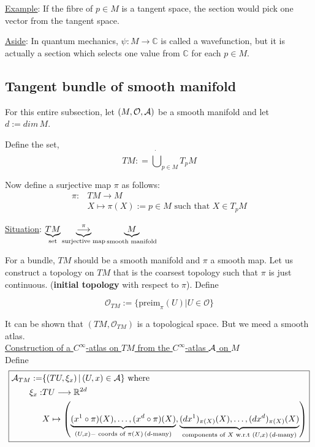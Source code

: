\underline{Example}: If the fibre of $p \in M$ is a tangent space, the section would pick one vector from the tangent space.

\underline{Aside}: In quantum mechanics, $\psi : M \to \mathbb{C}$ is called a wavefunction, but it is actually a section which selects one value from $\mathbb{C}$ for each $p \in M$.


\subsection{Tangent bundle of smooth manifold}
For this entire subsection, let $(M, \mathcal{O}, \mathcal{A})$ be a smooth manifold and let $d := dim \, M$. 

Define the set, 
\begin{equation}
\boxed{TM : = \dot{\bigcup}_{p \in M} T_pM}
\end{equation}

Now define a surjective map $\pi$ as follows:
\begin{equation}
\boxed{\begin{split}
  \pi : & TM \to M \\
  & X \mapsto \pi(X) := p \in M \text{ such that } X \in T_pM
\end{split}}
\end{equation}

\underline{Situation}:  $\underbrace{TM}_{\text{set}} \underbrace{ \stackrel{\pi}{\longrightarrow}}_{\text{surjective map}} \underbrace{M}_{\text{smooth manifold}}$

For a bundle, $TM$ should be a smooth manifold and $\pi$ a smooth map. Let us construct a topology on $TM$ that is the coarsest topology such that $\pi$ is just continuous. (\textbf{initial topology} with respect to $\pi$). Define

\begin{equation}
\boxed{\mathcal{O}_{TM} := \lbrace \text{preim}_{\pi}(U) | U \in \mathcal{O} \rbrace}
\end{equation}

It can be shown that $(TM,\mathcal{O}_{TM})$ is a topological space. But we meed a smooth atlas.\\

\underline{Construction of a $C^{\infty}$-atlas on $TM$ from the $C^{\infty}$-atlas $\mathcal{A}$ on $M$} \\
Define
\begin{equation}\label{eq:atlasTangentBundle}
\boxed{
\begin{split}
\mathcal{A}_{TM} := & \lbrace (TU,\xi_x) \, | \, (U,x) \in \mathcal{A} \rbrace \text{ where } \\
  \xi_x : & TU \longrightarrow \mathbb{R}^{2d} \\
  & X \mapsto \left(\underbrace{(x^1 \circ \pi)(X), \dotsc, (x^d \circ \pi)(X)}_{(U,x)-\text{ coords of } \pi(X) \, (d\text{-many})}, \underbrace{(dx^1)_{\pi(X)}(X), \dotsc, (dx^d)_{\pi(X)}(X)}_{\text{components of $X$ w.r.t } (U,x) \, (d\text{-many})}\right)
\end{split}
}
\end{equation}


